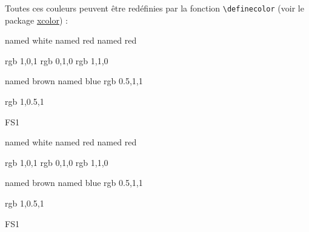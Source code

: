 		Toutes ces couleurs peuvent être redéfinies par la fonction {\color{blue}\verb'\definecolor'}
		(voir le package \href{http://www.ctan.org/tex-archive/macros/latex/contrib/xcolor/}{xcolor}) :

\begin{code}
\definecolor{fastCouleurTexteFS}	{named}	{white}
\definecolor{fastCouleurBorduresFS}	{named}	{red}
\definecolor{fastCouleurFondFS}		{named}	{red}

\definecolor{fastCouleurTexteFT}	{rgb}	{1,0,1}
\definecolor{fastCouleurBorduresFT}	{rgb}	{0,1,0}
\definecolor{fastCouleurFondFT}		{rgb}	{1,1,0}

\definecolor{fastCouleurTexteST}	{named}	{brown}
\definecolor{fastCouleurBorduresST}	{named}	{blue}
\definecolor{fastCouleurFondST}		{rgb}	{0.5,1,1}

\definecolor{fastCouleurConnecteurs}	{rgb}	{1,0.5,1}
\begin{fast}{FS1}
\end{fast}
\fastReset
\end{code}
\cqd
\begin{exemple}
\definecolor{fastCouleurTexteFS}	{named}	{white}
\definecolor{fastCouleurBorduresFS}	{named}	{red}
\definecolor{fastCouleurFondFS}		{named}	{red}

\definecolor{fastCouleurTexteFT}	{rgb}	{1,0,1}
\definecolor{fastCouleurBorduresFT}	{rgb}	{0,1,0}
\definecolor{fastCouleurFondFT}		{rgb}	{1,1,0}

\definecolor{fastCouleurTexteST}	{named}	{brown}
\definecolor{fastCouleurBorduresST}	{named}	{blue}
\definecolor{fastCouleurFondST}		{rgb}	{0.5,1,1}

\definecolor{fastCouleurConnecteurs}	{rgb}	{1,0.5,1}
\begin{fast}{FS1}
\end{fast}
\fastReset
\end{exemple}

